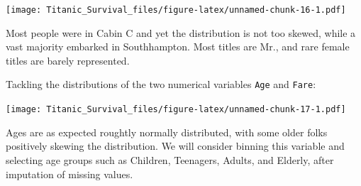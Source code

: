 \documentclass[]{article}
\newenvironment{Shaded}{\begin{snugshade}}{\end{snugshade}}
\newcommand{\KeywordTok}[1]{\textcolor[rgb]{0.13,0.29,0.53}{\textbf{#1}}}
\newcommand{\DataTypeTok}[1]{\textcolor[rgb]{0.13,0.29,0.53}{#1}}
\newcommand{\DecValTok}[1]{\textcolor[rgb]{0.00,0.00,0.81}{#1}}
\newcommand{\FloatTok}[1]{\textcolor[rgb]{0.00,0.00,0.81}{#1}}
\newcommand{\StringTok}[1]{\textcolor[rgb]{0.31,0.60,0.02}{#1}}
\newcommand{\OtherTok}[1]{\textcolor[rgb]{0.56,0.35,0.01}{#1}}
\newcommand{\OperatorTok}[1]{\textcolor[rgb]{0.81,0.36,0.00}{\textbf{#1}}}
\newcommand{\NormalTok}[1]{#1}
\begin{document}
\texttt{[image: Titanic\_Survival\_files/figure-latex/unnamed-chunk-16-1.pdf]}

Most people were in Cabin C and yet the distribution is not too skewed,
while a vast majority embarked in Southhampton. Most titles are Mr., and
rare female titles are barely represented.

Tackling the distributions of the two numerical variables \texttt{Age}
and \texttt{Fare}:

\begin{Shaded}
\end{Shaded}

\texttt{[image: Titanic\_Survival\_files/figure-latex/unnamed-chunk-17-1.pdf]}

Ages are as expected roughtly normally distributed, with some older
folks positively skewing the distribution. We will consider binning this
variable and selecting age groups such as Children, Teenagers, Adults,
and Elderly, after imputation of missing values.
\end{document}
